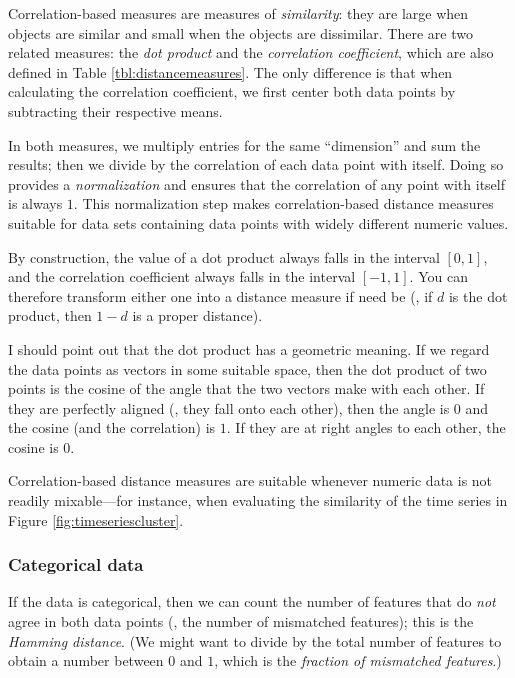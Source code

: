 Correlation-based measures are measures of \emph{similarity}: they are
large when objects are similar and small when the objects are
dissimilar. There are two related measures: the \emph{dot product}  and
the \emph{correlation coefficient},  which are also defined in Table
\ref{tbl:distancemeasures}. The only difference is that when
calculating the correlation coefficient, we first center both data
points by subtracting their respective means.


In both measures, we multiply entries for the same ``dimension'' and
sum the results; then we divide by the correlation of each data point
with itself. Doing so provides a \emph{normalization} and ensures that
the correlation of any point with itself is always $1$. This
normalization step makes correlation-based distance measures suitable
for data sets containing data points with widely different numeric
values.

By construction, the value of a dot product always falls in the
interval $[0,1]$, and the correlation coefficient always falls in the
interval $[-1,1]$. You can therefore transform either one into a
distance measure if need be (\eg, if $d$ is the dot product, then
$1-d$ is a proper distance).

I should point out that the dot product has a geometric meaning. If we
regard the data points as vectors in some suitable space, then the dot
product of two points is the cosine of the angle that the two vectors
make with each other. If they are perfectly aligned (\ie, they fall
onto each other), then the angle is $0$ and the cosine (and the
correlation) is $1$. If they are at right angles to each other, the
cosine is $0$.

\enlargethispage{6pt}

Correlation-based distance measures are suitable whenever numeric data
is not readily mixable---for instance, when evaluating the similarity
of the time series in Figure \ref{fig:timeseriescluster}.

\vspace*{-6pt}      
\subsubsection{Categorical data}


If the data is categorical, then we can count the number of features
that do \emph{not} agree in both data points (\ie, the number of
mismatched features); this is the \emph{Hamming distance}.  (We might
want to divide by the total number of features to obtain a number
between $0$ and $1$, which is the \emph{fraction of mismatched
  features}.)

